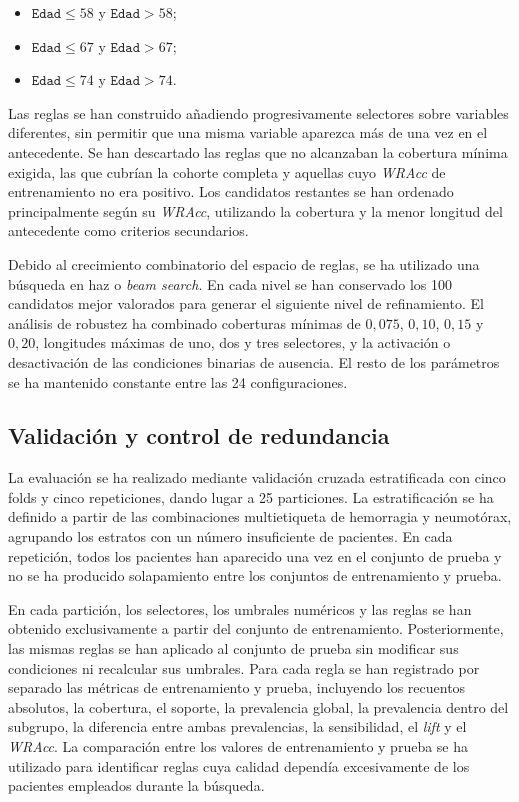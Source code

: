 \begin{itemize}
    \item \(\texttt{Edad} \leq 58\) y \(\texttt{Edad} > 58\);
    \item \(\texttt{Edad} \leq 67\) y \(\texttt{Edad} > 67\);
    \item \(\texttt{Edad} \leq 74\) y \(\texttt{Edad} > 74\).
\end{itemize}


Las reglas se han construido añadiendo progresivamente selectores sobre variables diferentes, sin permitir que una misma variable aparezca más de una vez en el antecedente. Se han descartado las reglas que no alcanzaban la cobertura mínima exigida, las que cubrían la cohorte completa y aquellas cuyo \textit{WRAcc} de entrenamiento no era positivo. Los candidatos restantes se han ordenado principalmente según su \textit{WRAcc}, utilizando la cobertura y la menor longitud del antecedente como criterios secundarios.

Debido al crecimiento combinatorio del espacio de reglas, se ha utilizado una búsqueda en haz o \textit{beam search}. En cada nivel se han conservado los 100 candidatos mejor valorados para generar el siguiente nivel de refinamiento. El análisis de robustez ha combinado coberturas mínimas de \(0{,}075\), \(0{,}10\), \(0{,}15\) y \(0{,}20\), longitudes máximas de uno, dos y tres selectores, y la activación o desactivación de las condiciones binarias de ausencia. El resto de los parámetros se ha mantenido constante entre las 24 configuraciones.

\subsection{Validación y control de redundancia}

La evaluación se ha realizado mediante validación cruzada estratificada con cinco folds y cinco repeticiones, dando lugar a 25 particiones. La estratificación se ha definido a partir de las combinaciones multietiqueta de hemorragia y neumotórax, agrupando los estratos con un número insuficiente de pacientes. En cada repetición, todos los pacientes han aparecido una vez en el conjunto de prueba y no se ha producido solapamiento entre los conjuntos de entrenamiento y prueba.

En cada partición, los selectores, los umbrales numéricos y las reglas se han obtenido exclusivamente a partir del conjunto de entrenamiento. Posteriormente, las mismas reglas se han aplicado al conjunto de prueba sin modificar sus condiciones ni recalcular sus umbrales. Para cada regla se han registrado por separado las métricas de entrenamiento y prueba, incluyendo los recuentos absolutos, la cobertura, el soporte, la prevalencia global, la prevalencia dentro del subgrupo, la diferencia entre ambas prevalencias, la sensibilidad, el \textit{lift} y el \textit{WRAcc}. La comparación entre los valores de entrenamiento y prueba se ha utilizado para identificar reglas cuya calidad dependía excesivamente de los pacientes empleados durante la búsqueda.

